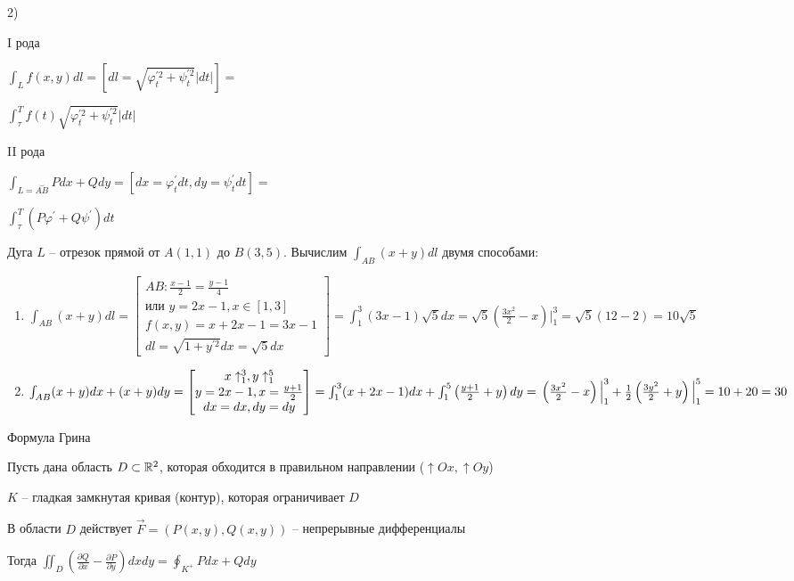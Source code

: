\documentclass[12pt]{article}
\begin{document}
    2) \begin{multicols}{2}
        I рода

        $\int_{L} f(x, y) dl = \left[dl = \sqrt{\varphi_t^{\prime 2} + \psi_t^{\prime 2}}|dt|\right] = $

        $\int_\tau^T f(t) \sqrt{\varphi_t^{\prime 2} + \psi_t^{\prime 2}}|dt|$

        II рода

        $\int_{L = \overset{\smile}{AB}}Pdx + Qdy = [dx = \varphi_t^\prime dt, dy = \psi_t^\prime dt] = $

        $\int_\tau^T (P\varphi^\prime + Q\psi^\prime)dt$

    \end{multicols}

    \Ex Дуга $L$ -- отрезок прямой от $A(1, 1)$ до $B(3, 5)$. Вычислим $\int_{AB} (x + y) dl$ двумя способами:

    \begin{enumerate}
        \item $\int_{AB} (x + y) dl = \begin{bmatrix}AB: \frac{x - 1}{2} = \frac{y - 1}{4} \\
        \text{или } y = 2x - 1, x \in [1, 3] \\
        f(x, y) = x + 2x - 1 = 3x - 1 \\
        dl = \sqrt{1 + y^{\prime 2}}dx = \sqrt{5}dx\end{bmatrix} =
        \int_1^3 (3x - 1) \sqrt{5}dx = \sqrt{5} \left(\frac{3x^2}{2} - x\right) \Big|_1^3 = \sqrt{5}(12 - 2) = 10\sqrt{5}$

        \item $\int_{AB} (x + y) dx + (x + y) dy = \begin{bmatrix}x \uparrow^3_1, y \uparrow^5_1 \\
        y = 2x - 1, x = \frac{y + 1}{2} \\
        dx = dx, dy = dy\end{bmatrix} = \int_1^3 (x + 2x - 1) dx + \int^5_1 \left(\frac{y + 1}{2} + y\right) dy = \\
        \left(\frac{3x^2}{2} - x\right) \Big|_1^3 + \frac{1}{2} \left(\frac{3y^2}{2} + y\right) \Big|_1^5 = 10 + 20 = 30$
    \end{enumerate}

    \hypertarget{formulaGreen}{}

    \begin{MyTheorem}
        \Ths Формула Грина

        Пусть дана область $D \subset \mathbb{R}^2$, которая обходится в правильном направлении ($\uparrow Ox, \uparrow Oy$)

        $K$ -- гладкая замкнутая кривая (контур), которая ограничивает $D$

        В области $D$ действует $\vec{F} = (P(x, y), Q(x, y))$ -- непрерывные дифференциалы

        Тогда $\iint_D \left(\frac{\partial Q}{\partial x} - \frac{\partial P}{\partial y}\right) dxdy = \oint_{K^+} Pdx + Qdy$
    \end{MyTheorem}
\end{document}
